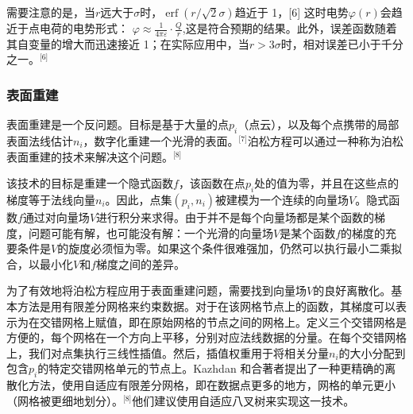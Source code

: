 需要注意的是，当\(r\)远大于\(\sigma\)时，\(\operatorname{erf}(r / \sqrt{2} \sigma)\)趋近于 1，[6] 这时电势\(\varphi(r)\)会趋近于点电荷的电势形式：
\(\varphi \approx \frac{1}{4\pi \varepsilon} \cdot \frac{Q}{r}\),这是符合预期的结果。此外，误差函数随着其自变量的增大而迅速接近 1；在实际应用中，当\(r > 3\sigma\)时，相对误差已小于千分之一。\(^\text{[6]}\)
\subsubsection{表面重建}
表面重建是一个反问题。目标是基于大量的点\(p_i\)（点云），以及每个点携带的局部表面法线估计\(n_i\)，数字化重建一个光滑的表面。\(^\text{[7]}\)泊松方程可以通过一种称为泊松表面重建的技术来解决这个问题。\(^\text{[8]}\)

该技术的目标是重建一个隐式函数\(f\)，该函数在点\(p_i\)处的值为零，并且在这些点的梯度等于法线向量\(n_i\)。因此，点集\((p_i, n_i)\)被建模为一个连续的向量场\(V\)。隐式函数\(f\)通过对向量场\(V\)进行积分来求得。由于并不是每个向量场都是某个函数的梯度，问题可能有解，也可能没有解：一个光滑的向量场\(V\)是某个函数\(f\)的梯度的充要条件是\(V\)的旋度必须恒为零。如果这个条件很难强加，仍然可以执行最小二乘拟合，以最小化\(V\)和\(f\)梯度之间的差异。

为了有效地将泊松方程应用于表面重建问题，需要找到向量场\(V\)的良好离散化。基本方法是用有限差分网格来约束数据。对于在该网格节点上的函数，其梯度可以表示为在交错网格上赋值，即在原始网格的节点之间的网格上。定义三个交错网格是方便的，每个网格在一个方向上平移，分别对应法线数据的分量。在每个交错网格上，我们对点集执行三线性插值。然后，插值权重用于将相关分量\(n_i\)的大小分配到包含\(p_i\)的特定交错网格单元的节点上。Kazhdan 和合著者提出了一种更精确的离散化方法，使用自适应有限差分网格，即在数据点更多的地方，网格的单元更小（网格被更细地划分）。\(^\text{[8]}\)他们建议使用自适应八叉树来实现这一技术。